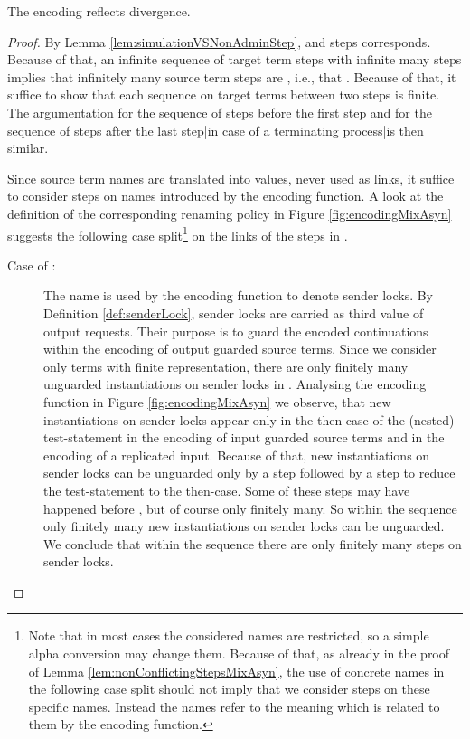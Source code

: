 \documentclass[]{llncs}
\begin{document}
\begin{lemma} \label{lem:divergenceReflectionMixAsyn}
	The encoding  reflects divergence.
\end{lemma}

\begin{proof}
	By Lemma \ref{lem:simulationVSNonAdminStep}, \simulations and \nonAdmin steps corresponds. Because of that, an infinite sequence of target term steps  with infinite many \nonAdmin steps implies that infinitely many source term steps are \simulated, i.e., that . Because of that, it suffice to show that each sequence  on target terms  between two \nonAdmin steps is finite. The argumentation for the sequence of \admin steps  before the first \nonAdmin step and for the sequence of \admin steps after the last \nonAdmin step|in case of a terminating process|is then similar.
	
	Since source term names are translated into values, never used as links, it suffice to consider steps on names introduced by the encoding function. A look at the definition of the corresponding renaming policy in Figure \ref{fig:encodingMixAsyn} suggests the following case split\footnote{Note that in most cases the considered names are restricted, so a simple alpha conversion may change them. Because of that, as already in the proof of Lemma \ref{lem:nonConflictingStepsMixAsyn}, the use of concrete names in the following case split should not imply that we consider steps on these specific names. Instead the names refer to the meaning which is related to them by the encoding function.} on the links of the steps in .
	\begin{description}
		\item[Case of :] The name  is used by the encoding function to denote sender locks. By Definition \ref{def:senderLock}, sender locks are carried as third value of output requests. Their purpose is to guard the encoded continuations within the encoding of output guarded source terms. Since we consider only terms with finite representation, there are only finitely many unguarded instantiations on sender locks in . Analysing the encoding function in Figure \ref{fig:encodingMixAsyn} we observe, that new instantiations on sender locks appear only in the then-case of the (nested) test-statement in the encoding of input guarded source terms and in the encoding of a replicated input. Because of that, new instantiations on sender locks can be unguarded only by a \nonAdmin step followed by a \pure \admin step to reduce the test-statement to the then-case. Some of these \nonAdmin steps may have happened before , but of course only finitely many. So within the sequence  only finitely many new instantiations on sender locks can be unguarded. We conclude that within the sequence  there are only finitely many steps on sender locks.
			

\end{description}
\end{proof}
\end{document}
